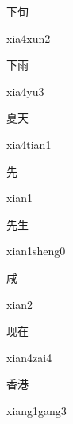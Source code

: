 \begin{multicols*}{2}
\begin{verbete}{下旬}
\begin{pronuncia}{xia4xun2}
\end{pronuncia}
\end{verbete}

\begin{verbete}[xia4yu3]{下雨}
\begin{pronuncia}{xia4yu3}
\end{pronuncia}
\end{verbete}

\begin{verbete}{夏天}
\begin{pronuncia}{xia4tian1}
\end{pronuncia}
\end{verbete}

\begin{verbete}[xian1]{先}
\begin{pronuncia}{xian1}
\end{pronuncia}
\end{verbete}

\begin{verbete}{先生}
\begin{pronuncia}{xian1sheng0}
\end{pronuncia}
\end{verbete}

\begin{verbete}[xian2]{咸}
\begin{pronuncia}{xian2}
\end{pronuncia}
\end{verbete}

\begin{verbete}{现在}
\begin{pronuncia}{xian4zai4}
\end{pronuncia}
\end{verbete}

\begin{verbete}{香港}
\begin{pronuncia}{xiang1gang3}
\end{pronuncia}
\end{verbete}


\end{multicols*}
